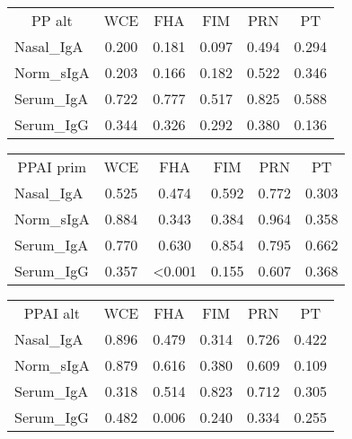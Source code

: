 \documentclass[
]{article}
\begin{document}
\begin{tabular}{>{}l|>{}c|>{}c|>{}c|>{}c|c}
\hline
\multicolumn{1}{c|}{PP alt} & \multicolumn{1}{c|}{WCE} & \multicolumn{1}{c|}{FHA} & \multicolumn{1}{c|}{FIM} & \multicolumn{1}{c|}{PRN} & \multicolumn{1}{c}{PT} \\
\cline{1-1} \cline{2-2} \cline{3-3} \cline{4-4} \cline{5-5} \cline{6-6}
Nasal\_IgA & 0.200 & 0.181 & 0.097 & 0.494 & 0.294\\
\hline
Norm\_sIgA & 0.203 & 0.166 & 0.182 & 0.522 & 0.346\\
\hline
Serum\_IgA & 0.722 & 0.777 & 0.517 & 0.825 & 0.588\\
\hline
Serum\_IgG & 0.344 & 0.326 & 0.292 & 0.380 & 0.136\\
\hline
\end{tabular}

\begin{tabular}{>{}l|>{}c|>{}c|>{}c|>{}c|c}
\hline
\multicolumn{1}{c|}{PPAI prim} & \multicolumn{1}{c|}{WCE} & \multicolumn{1}{c|}{FHA} & \multicolumn{1}{c|}{FIM} & \multicolumn{1}{c|}{PRN} & \multicolumn{1}{c}{PT} \\
\cline{1-1} \cline{2-2} \cline{3-3} \cline{4-4} \cline{5-5} \cline{6-6}
Nasal\_IgA & 0.525 & 0.474 & 0.592 & 0.772 & 0.303\\
\hline
Norm\_sIgA & 0.884 & 0.343 & 0.384 & 0.964 & 0.358\\
\hline
Serum\_IgA & 0.770 & 0.630 & 0.854 & 0.795 & 0.662\\
\hline
Serum\_IgG & 0.357 & <0.001 & 0.155 & 0.607 & 0.368\\
\hline
\end{tabular}

\begin{tabular}{>{}l|>{}c|>{}c|>{}c|>{}c|c}
\hline
\multicolumn{1}{c|}{PPAI alt} & \multicolumn{1}{c|}{WCE} & \multicolumn{1}{c|}{FHA} & \multicolumn{1}{c|}{FIM} & \multicolumn{1}{c|}{PRN} & \multicolumn{1}{c}{PT} \\
\cline{1-1} \cline{2-2} \cline{3-3} \cline{4-4} \cline{5-5} \cline{6-6}
Nasal\_IgA & 0.896 & 0.479 & 0.314 & 0.726 & 0.422\\
\hline
Norm\_sIgA & 0.879 & 0.616 & 0.380 & 0.609 & 0.109\\
\hline
Serum\_IgA & 0.318 & 0.514 & 0.823 & 0.712 & 0.305\\
\hline
Serum\_IgG & 0.482 & 0.006 & 0.240 & 0.334 & 0.255\\
\hline
\end{tabular}
\end{document}
